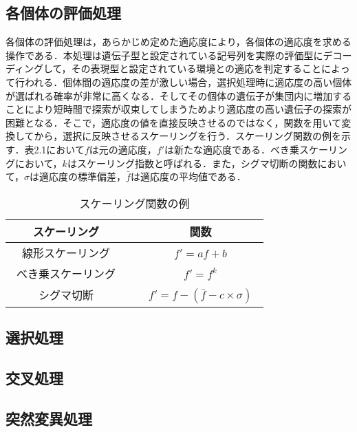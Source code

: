 \subsection{各個体の評価処理}
\label{sec2.1.2}
  
各個体の評価処理は，あらかじめ定めた適応度により，各個体の適応度を求める操作である．本処理は遺伝子型と設定されている記号列を実際の評価型にデコーディングして，その表現型と設定されている環境との適応を判定することによって行われる．個体間の適応度の差が激しい場合，選択処理時に適応度の高い個体が選ばれる確率が非常に高くなる．そしてその個体の遺伝子が集団内に増加することにより短時間で探索が収束してしまうためより適応度の高い遺伝子の探索が困難となる．そこで，適応度の値を直接反映させるのではなく，関数を用いて変換してから，選択に反映させるスケーリングを行う．スケーリング関数の例を示す．表2.1において$f$は元の適応度，$f'$は新たな適応度である．べき乗スケーリングにおいて，$k$はスケーリング指数と呼ばれる．また，シグマ切断の関数において，$\sigma$は適応度の標準偏差，$\bar{f}$は適応度の平均値である．

\begin{table}[!ht]
\caption{スケーリング関数の例}
\label{tb:sk}
\begin{center}
\begin{tabular}{|c||c|}\hline
スケーリング　&　関数　\\ \hline
線形スケーリング　&　$f'=af+b$　\\ \hline
べき乗スケーリング　&　$f'=f^{k}$　\\ \hline
シグマ切断　&　$f'=f-( \bar{f} - c \times \sigma )$　\\ \hline
\end{tabular}
\end{center}
\end{table}

\subsection{選択処理}
\label{sec2.1.3}

\subsection{交叉処理}
\label{sec2.1.4}

\subsection{突然変異処理}
\label{sec2.1.5}




